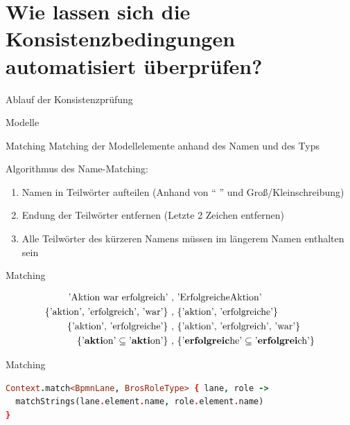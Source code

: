 \section{Wie lassen sich die Konsistenzbedingungen automatisiert überprüfen?}

\begin{frame}{Ablauf der Konsistenzprüfung}
  
\end{frame}

\begin{frame}{Modelle}
  
\end{frame}

\begin{frame}{Matching}
  Matching der Modellelemente anhand des Namen und des Typs

  Algorithmus des Name-Matching:
  \begin{enumerate}
    \item Namen in Teilwörter aufteilen (Anhand von `` '' und Groß/Kleinschreibung)
    \item Endung der Teilwörter entfernen (Letzte 2 Zeichen entfernen)
    \item Alle Teilwörter des kürzeren Namens müssen im längerem Namen enthalten sein
  \end{enumerate}
\end{frame}
\begin{frame}{Matching}
  \begin{figure}
    \centering
    \begin{align}
        \text{'Aktion war erfolgreich'}\ ,&\ \text{'ErfolgreicheAktion'} \nonumber\\
        \text{\{'aktion', 'erfolgreich', 'war'\}}\ ,&\ \text{\{'aktion', 'erfolgreiche'\}} \nonumber\\
        \text{\{'aktion', 'erfolgreiche'\}}\ ,&\ \text{\{'aktion', 'erfolgreich', 'war'\}} \nonumber\\
        \text{\{'\textbf{akti}on'} \subseteq \text{'\textbf{akti}on'\}}\ ,&\ \text{\{'\textbf{erfolgreic}he'} \subseteq \text{'\textbf{erfolgrei}ch'\}} \nonumber
    \end{align}
    \label{eq:name_matching}
  \end{figure}
\end{frame}
\begin{frame}[fragile]{Matching}
\begin{lstlisting}[language=Prolog]
Context.match<BpmnLane, BrosRoleType> { lane, role ->
  matchStrings(lane.element.name, role.element.name)
}
\end{lstlisting}
\end{frame}

